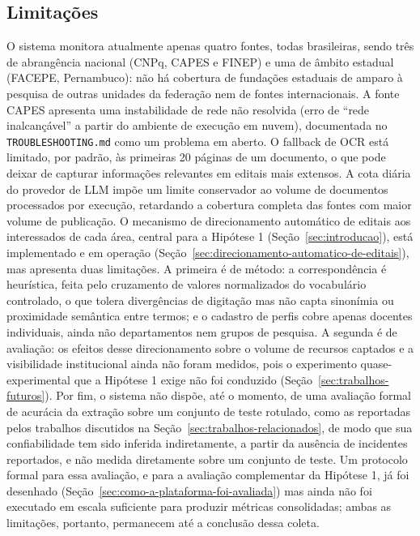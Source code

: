\documentclass[12pt]{article}
\begin{document}
  \subsection{Limitações}\label{sec:limitacoes}
  O sistema monitora atualmente apenas quatro fontes, todas brasileiras, sendo três de abrangência nacional (CNPq, CAPES e FINEP) e uma de âmbito estadual (FACEPE, Pernambuco): não há cobertura de fundações estaduais de amparo à pesquisa de outras unidades da federação nem de fontes internacionais. A fonte CAPES apresenta uma instabilidade de rede não resolvida (erro de ``rede inalcançável'' a partir do ambiente de execução em nuvem), documentada no \texttt{TROUBLESHOOTING.md} como um problema em aberto. O fallback de OCR está limitado, por padrão, às primeiras 20 páginas de um documento, o que pode deixar de capturar informações relevantes em editais mais extensos. A cota diária do provedor de LLM impõe um limite conservador ao volume de documentos processados por execução, retardando a cobertura completa das fontes com maior volume de publicação. O mecanismo de direcionamento automático de editais aos interessados de cada área, central para a Hipótese 1 (Seção~\ref{sec:introducao}), está implementado e em operação (Seção~\ref{sec:direcionamento-automatico-de-editais}), mas apresenta duas limitações. A primeira é de método: a correspondência é heurística, feita pelo cruzamento de valores normalizados do vocabulário controlado, o que tolera divergências de digitação mas não capta sinonímia ou proximidade semântica entre termos; e o cadastro de perfis cobre apenas docentes individuais, ainda não departamentos nem grupos de pesquisa. A segunda é de avaliação: os efeitos desse direcionamento sobre o volume de recursos captados e a visibilidade institucional ainda não foram medidos, pois o experimento quase-experimental que a Hipótese 1 exige não foi conduzido (Seção~\ref{sec:trabalhos-futuros}). Por fim, o sistema não dispõe, até o momento, de uma avaliação formal de acurácia da extração sobre um conjunto de teste rotulado, como as reportadas pelos trabalhos discutidos na Seção~\ref{sec:trabalhos-relacionados}, de modo que sua confiabilidade tem sido inferida indiretamente, a partir da ausência de incidentes reportados, e não medida diretamente sobre um conjunto de teste. Um protocolo formal para essa avaliação, e para a avaliação complementar da Hipótese 1, já foi desenhado (Seção~\ref{sec:como-a-plataforma-foi-avaliada}) mas ainda não foi executado em escala suficiente para produzir métricas consolidadas; ambas as limitações, portanto, permanecem até a conclusão dessa coleta.
\end{document}
